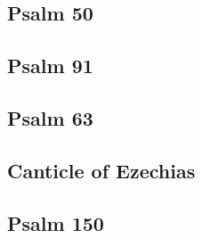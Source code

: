 \documentclass[12pt, a5paper]{book}
\begin{document}



\subsection{Psalm 50}









\subsection{Psalm 91}









\subsection{Psalm 63}









\subsection{Canticle of Ezechias}









\subsection{Psalm 150}





\end{document}
